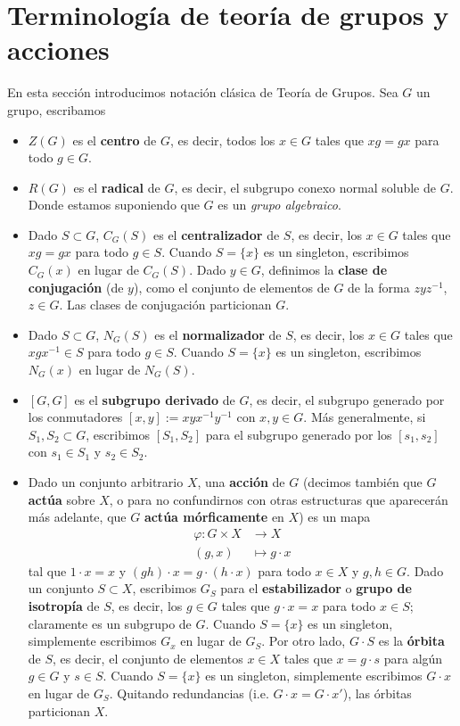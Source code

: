 \documentclass[spanish,10pt]{amsart}
\theoremstyle{definition}
\theoremstyle{remark}
\numberwithin{equation}{section}
\begin{document}
\section{Terminología de teoría de grupos y acciones}
En esta sección introducimos notación clásica de Teoría de Grupos. Sea $G$ un grupo, escribamos
\begin{itemize}
\item $Z(G)$ es el \textbf{centro} de $G$, es decir, todos los $x \in G$ tales que $x g = g x$ para todo $g \in G$.
\item $R(G)$ es el \textbf{radical} de $G$, es decir, el subgrupo conexo normal soluble de $G$. Donde estamos suponiendo que $G$ es un \textit{grupo algebraico}.
\item Dado $S \subset G$, $C_G (S)$ es el \textbf{centralizador} de $S$, es decir, los $x \in G$ tales que $x g = g x$ para todo $g \in S$. Cuando $S = \{x\}$ es un singleton, escribimos $C_G (x)$ en lugar de $C_G (S)$. Dado $y \in G$, definimos la \textbf{clase de conjugación} (de $y$), como el conjunto de elementos de $G$ de la forma $z y z^{-1}$, $z \in G$. Las clases de conjugación particionan $G$.
\item Dado $S \subset G$, $N_G (S)$ es el \textbf{normalizador} de $S$, es decir, los $x \in G$ tales que $x g x^{-1} \in S$ para todo $g \in S$. Cuando $S = \{x\}$ es un singleton, escribimos $N_G (x)$ en lugar de $N_G (S)$.
\item $[G,G]$ es el \textbf{subgrupo derivado} de $G$, es decir, el subgrupo generado por los conmutadores $[x,y] := x y x^{-1}y^{-1}$ con $x,y \in G$. Más generalmente, si $S_1, S_2 \subset G$, escribimos $[S_1, S_2]$ para el subgrupo generado por los $[s_1,s_2]$ con $s_1 \in S_1 $ y $s_2 \in S_2$.
\item Dado un conjunto arbitrario $X$, una \textbf{acción} de $G$ (decimos también que $G$ \textbf{actúa} sobre $X$, o para no confundirnos con otras estructuras que aparecerán más adelante, que $G$ \textbf{actúa mórficamente} en $X$) es un mapa
\begin{align*}
\varphi : G \times X &\longrightarrow X \\
(g,x) &\longmapsto g \cdot x
\end{align*}
tal que $1 \cdot x = x$ y $(gh) \cdot x = g \cdot (h \cdot x)$ para todo $x \in X$ y $g,h \in G$. Dado un conjunto $S \subset X$, escribimos $G_S$ para el \textbf{estabilizador} o \textbf{grupo de isotropía} de $S$, es decir, los $g \in G$ tales que $g \cdot x = x$ para todo $x \in S$; claramente es un subgrupo de $G$. Cuando $S = \{x\}$ es un singleton, simplemente escribimos $G_x$ en lugar de $G_S$. Por otro lado, $G \cdot S$ es la \textbf{órbita} de $S$, es decir, el conjunto de elementos $x \in X$ tales que $x = g \cdot s$ para algún $g \in G$ y $s \in S$. Cuando $S = \{x\}$ es un singleton, simplemente escribimos $G \cdot x$ en lugar de $G_S$. Quitando redundancias (i.e. $G \cdot x = G \cdot x'$), las órbitas particionan $X$.

\end{itemize}
\end{document}
